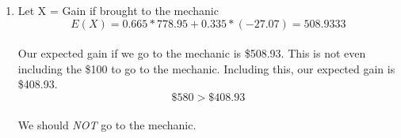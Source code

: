 \documentclass[12pt,a4paper]{report}
\begin{document}
\begin{enumerate}
\begin{enumerate}
	\item
	Let X = Gain if brought to the mechanic
	\[E(X) = 0.665*778.95 + 0.335*(-27.07) = 508.9333 \]\\
	Our expected gain if we go to the mechanic is \$508.93. This is not even including the \$100 to go to the mechanic. Including this, our expected gain is \$408.93.
	\[ \$580 > \$408.93 \]\\
	We should \textit{NOT} go to the mechanic.\\
	
\end{enumerate}

\end{enumerate}
\end{document}
